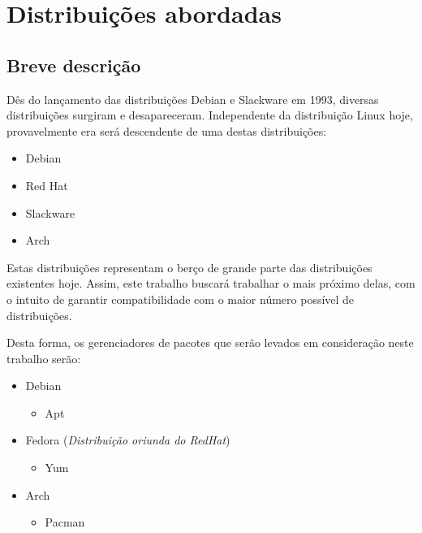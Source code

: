 \chapter{Distribuições abordadas} %
\label{sec:distribui_es_abordadas}

\section{Breve descrição} %
\label{sec:breve_descri_o}

Dês do lançamento das distribuições Debian e Slackware em 1993, diversas distribuições surgiram e desapareceram. Independente da distribuição Linux hoje, provavelmente era será descendente de uma destas distribuições:

\begin{itemize}
	\item Debian
	\item Red Hat
	\item Slackware
	\item Arch
\end{itemize}

Estas distribuições representam o berço de grande parte das distribuições existentes hoje. Assim, este trabalho buscará trabalhar o mais próximo delas, com o intuito de garantir compatibilidade com o maior número possível de distribuições.

Desta forma, os gerenciadores de pacotes que serão levados em consideração neste trabalho serão:

\begin{itemize}
	\item Debian
	\begin{itemize}
		\item Apt
	\end{itemize}
	\item Fedora (\textit{Distribuição oriunda do RedHat})
	\begin{itemize}
		\item Yum
	\end{itemize}
	\item Arch
	\begin{itemize}
		\item Pacman
	\end{itemize}
\end{itemize}

